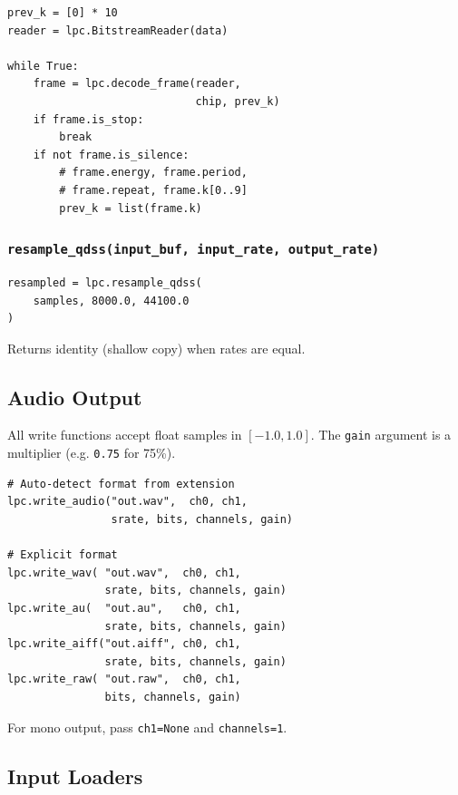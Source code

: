 \documentclass[10pt]{article}
\begin{document}
\begin{lstlisting}[caption={Frame-by-frame decoding loop}]
prev_k = [0] * 10
reader = lpc.BitstreamReader(data)

while True:
    frame = lpc.decode_frame(reader,
                             chip, prev_k)
    if frame.is_stop:
        break
    if not frame.is_silence:
        # frame.energy, frame.period,
        # frame.repeat, frame.k[0..9]
        prev_k = list(frame.k)
\end{lstlisting}

\subsubsection{\texttt{resample\_qdss(input\_buf, input\_rate, output\_rate)}}

\begin{lstlisting}
resampled = lpc.resample_qdss(
    samples, 8000.0, 44100.0
)
\end{lstlisting}

Returns identity (shallow copy) when rates are equal.

\subsection{Audio Output}

All write functions accept float samples in $[-1.0, 1.0]$.  The
\texttt{gain} argument is a multiplier (e.g. \texttt{0.75} for 75\%).

\begin{lstlisting}[caption={Audio output functions}]
# Auto-detect format from extension
lpc.write_audio("out.wav",  ch0, ch1,
                srate, bits, channels, gain)

# Explicit format
lpc.write_wav( "out.wav",  ch0, ch1,
               srate, bits, channels, gain)
lpc.write_au(  "out.au",   ch0, ch1,
               srate, bits, channels, gain)
lpc.write_aiff("out.aiff", ch0, ch1,
               srate, bits, channels, gain)
lpc.write_raw( "out.raw",  ch0, ch1,
               bits, channels, gain)
\end{lstlisting}

\noindent For mono output, pass \texttt{ch1=None} and \texttt{channels=1}.

\subsection{Input Loaders}
\end{document}
